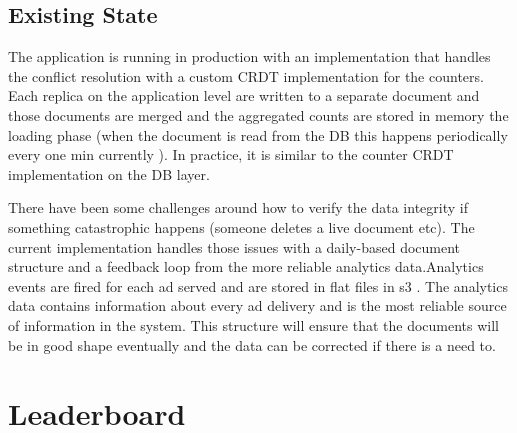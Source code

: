 \documentclass[11pt,a4paper]{report}
\begin{document}
\subsection{Existing State}
The application is running in production with an implementation that handles the conflict resolution with a custom CRDT implementation for the counters. Each replica on the application level are written to a separate document and those documents are merged and the aggregated counts are stored in memory the loading phase (when the document is read from the DB this happens periodically every one min currently ). In practice, it is similar to the counter CRDT implementation on the DB layer.

There have been some challenges around how to verify the data integrity if something catastrophic happens (someone deletes a live document etc). The current implementation handles those issues with a daily-based document structure and a feedback loop from the more reliable analytics data.Analytics events are fired for each ad served and are stored in flat files in s3 . The analytics data contains information about every ad delivery and is the most reliable source of information in the system. This structure will ensure that the documents will be in good shape eventually and the data can be corrected if there is a need to.



\section{Leaderboard}
\end{document}
